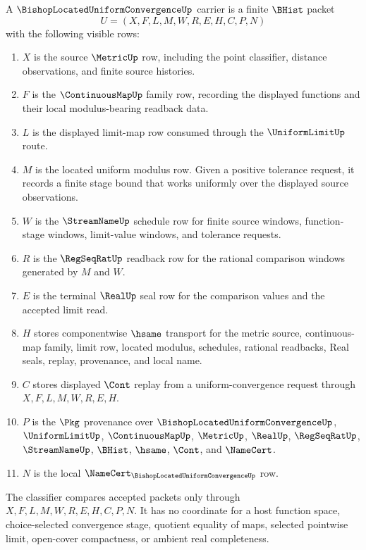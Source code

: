 \begin{definition}
\label{def:bishop-located-uniform-convergence-carrier}
A $\BishopLocatedUniformConvergenceUp$ carrier is a finite $\BHist$ packet
$$
U=(X,F,L,M,W,R,E,H,C,P,N)
$$
with the following visible rows:
\begin{enumerate}
\item $X$ is the source $\MetricUp$ row, including the point classifier, distance observations, and finite source histories.
\item $F$ is the $\ContinuousMapUp$ family row, recording the displayed functions and their local modulus-bearing readback data.
\item $L$ is the displayed limit-map row consumed through the $\UniformLimitUp$ route.
\item $M$ is the located uniform modulus row. Given a positive tolerance request, it records a finite stage bound that works uniformly over the displayed source observations.
\item $W$ is the $\StreamNameUp$ schedule row for finite source windows, function-stage windows, limit-value windows, and tolerance requests.
\item $R$ is the $\RegSeqRatUp$ readback row for the rational comparison windows generated by $M$ and $W$.
\item $E$ is the terminal $\RealUp$ seal row for the comparison values and the accepted limit read.
\item $H$ stores componentwise $\hsame$ transport for the metric source, continuous-map family, limit row, located modulus, schedules, rational readbacks, Real seals, replay, provenance, and local name.
\item $C$ stores displayed $\Cont$ replay from a uniform-convergence request through $X,F,L,M,W,R,E,H$.
\item $P$ is the $\Pkg$ provenance over $\BishopLocatedUniformConvergenceUp$, $\UniformLimitUp$, $\ContinuousMapUp$, $\MetricUp$, $\RealUp$, $\RegSeqRatUp$, $\StreamNameUp$, $\BHist$, $\hsame$, $\Cont$, and $\NameCert$.
\item $N$ is the local $\NameCert_{\BishopLocatedUniformConvergenceUp}$ row.
\end{enumerate}
The classifier compares accepted packets only through $X,F,L,M,W,R,E,H,C,P,N$. It has no coordinate for a host function space, choice-selected convergence stage, quotient equality of maps, selected pointwise limit, open-cover compactness, or ambient real completeness.
\end{definition}

